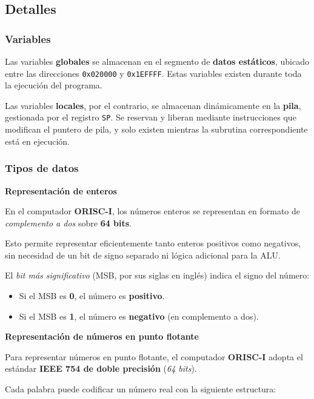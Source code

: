 \documentclass{article}
\begin{document}
\subsection{Detalles}

\subsubsection{Variables}

Las variables \textbf{globales} se almacenan en el segmento de
\textbf{datos estáticos}, ubicado entre las direcciones
\texttt{0x020000} y \texttt{0x1EFFFF}. Estas variables
existen durante toda la ejecución del programa.

Las variables \textbf{locales}, por el contrario, se
almacenan dinámicamente en la \textbf{pila}, gestionada por
el registro \texttt{SP}. Se reservan y liberan mediante
instrucciones que modifican el puntero de pila,
y solo existen mientras la subrutina
correspondiente está en ejecución.

\subsubsection{Tipos de datos}

\textbf{Representación de enteros}

En el computador \textbf{ORISC-I}, los números enteros se representan en formato de \textit{complemento a dos} sobre \textbf{64 bits}. 

Esto permite representar eficientemente tanto enteros positivos como negativos, sin necesidad de un bit de signo separado ni lógica adicional para la ALU.

El \textit{bit más significativo} (MSB, por sus siglas en inglés) indica el signo del número:

\begin{itemize}
    \item Si el MSB es \textbf{0}, el número es \textbf{positivo}.
    \item Si el MSB es \textbf{1}, el número es \textbf{negativo} (en complemento a dos).
\end{itemize}

\textbf{Representación de números en punto flotante}

Para representar números en punto flotante, el computador \textbf{ORISC-I} adopta el estándar \textbf{IEEE 754 de doble precisión} (\textit{64 bits}).

Cada palabra puede codificar un número real con la siguiente estructura:
\end{document}
